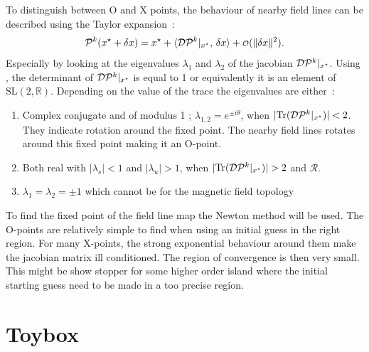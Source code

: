 To distinguish between O and X points, the behaviour of nearby field lines can be described using the Taylor expansion~:
\begin{equation*}
    \pmap^k(\z^\star+\delta \z) = \z^\star + \langle\dpmap^k\vert_{\z^\star},\, \delta\z\rangle + \smallO(\Vert\delta\z\Vert^2).
\end{equation*}
Especially by looking at the eigenvalues $\lambda_1$ and $\lambda_2$ of the jacobian $\mathcal{D}\mathcal{P}^k\vert_{x^\star}$. Using , the determinant of $\mathcal{D}\mathcal{P}^k\vert_{x^\star}$  is equal to 1 or equivalently it is an element of $\text{SL}(2,\mathbb{R})$. Depending on the value of the trace the eigenvalues are either~:
\begin{enumerate}
    \item Complex conjugate and of modulus 1 ; $\lambda_{1,2} = e^{\pm i\theta}$, when $\vert \text{Tr}(\mathcal{D}\mathcal{P}^k\vert_{x^\star})\vert < 2$. They indicate rotation around the fixed point. The nearby field lines rotates around this fixed point making it an O-point.
    \item Both real with $\vert\lambda_s\vert < 1$ and $\vert\lambda_u\vert > 1$, when $\vert \text{Tr}(\mathcal{D}\mathcal{P}^k\vert_{x^\star})\vert > 2$ and $\mathcal{R}$.
    \item $\lambda_1 = \lambda_2 = \pm 1$ which cannot be for the magnetic field topology
\end{enumerate}

To find the fixed point of the field line map the Newton method will be used. The O-points are relatively simple to find when using an initial guess in the right region. For many X-points, the strong exponential behaviour around them make the jacobian matrix ill conditioned. The region of convergence is then very small. This might be show stopper for some higher order island where the initial starting guess need to be made in a too precise region.

\chapter{Toybox}\label{ch:toybox}

